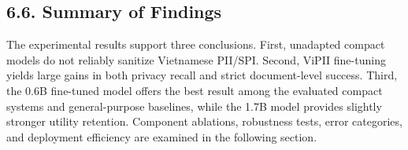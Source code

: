 \documentclass[
]{article}
\begin{document}
\subsection{6.6. Summary of Findings}\label{summary-of-findings}

The experimental results support three conclusions. First, unadapted
compact models do not reliably sanitize Vietnamese PII/SPI. Second,
ViPII fine-tuning yields large gains in both privacy recall and strict
document-level success. Third, the 0.6B fine-tuned model offers the best
result among the evaluated compact systems and general-purpose
baselines, while the 1.7B model provides slightly stronger utility
retention. Component ablations, robustness tests, error categories, and
deployment efficiency are examined in the following section.
\end{document}
